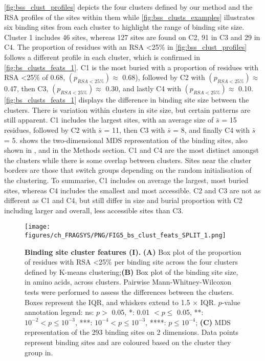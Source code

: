\autoref{fig:bss_clust_profiles} depicts the four clusters defined by our method and the RSA profiles of the sites within them while \autoref{fig:bss_clusts_examples} illustrates six binding sites from each cluster to highlight the range of binding site size. Cluster 1 includes 46 sites, whereas 127 sites are found on C2, 91 in C3 and 29 in C4. The proportion of residues with an RSA \textless 25\% in \autoref{fig:bss_clust_profiles} follows a different profile in each cluster, which is confirmed in \autoref{fig:bs_clusts_feats_1}. C1 is the most buried with a proportion of residues with RSA \textless 25\% of 0.68, $(p_{RSA<25\%}) \approx$ 0.68), followed by C2 with $(p_{RSA<25\%}) \approx$ 0.47, then C3, $(p_{RSA<25\%}) \approx$ 0.30, and lastly C4 with $(p_{RSA<25\%}) \approx$ 0.10. \autoref{fig:bs_clusts_feats_1} displays the difference in binding site size between the clusters. There is variation within clusters in site size, but certain patterns are still apparent. C1 includes the largest sites, with an average size of $\bar{s}$ = 15 residues, followed by C2 with $\bar{s}$ = 11, then C3 with $\bar{s}$ = 8, and finally C4 with $\bar{s}$ = 5.  shows the two-dimensional MDS representation of the binding sites, also shown in , and  in the Methods section. C1 and C4 are the most distinct amongst the clusters while there is some overlap between clusters. Sites near the cluster borders are those that switch groups depending on the random initialisation of the clustering. To summarise, C1 includes on average the largest, most buried sites, whereas C4 includes the smallest and most accessible. C2 and C3 are not as different as C1 and C4, but still differ in size and burial proportion with C2 including larger and overall, less accessible sites than C3.

\begin{figure}[ht!]
    \centering
    \texttt{[image: figures/ch\_FRAGSYS/PNG/FIG5\_bs\_clust\_feats\_SPLIT\_1.png]}
    \caption[Binding site cluster features (I)]{\textbf{Binding site cluster features (I).} \textbf{(A)} Box plot of the proportion of residues with RSA \textless 25\% per binding site across the four clusters defined by K-means clustering;\textbf{(B)} Box plot of the binding site size, in amino acids, across clusters. Pairwise Mann-Whitney-Wilcoxon tests were performed to assess the differences between the clusters. Boxes represent the IQR, and whiskers extend to 1.5 $\times$ IQR. $p$-value annotation legend: ns: $p >$ 0.05, *: 0.01 $< p \leq$ 0.05, **: $10^{-2} < p \leq 10^{-3}$, ***: $10^{-4} < p \leq 10^{-3}$, ****: $p \leq 10^{-4}$; \textbf{(C)} MDS representation of the 293 binding sites on 2 dimensions. Data points represent binding sites and are coloured based on the cluster they group in.}
    \label{fig:bs_clusts_feats_1}
\end{figure}


